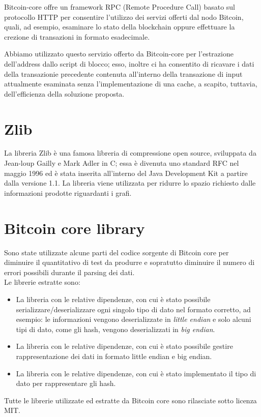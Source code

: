 Bitcoin-core offre un framework RPC (Remote Procedure Call) basato sul protocollo HTTP per consentire l'utilizzo dei servizi offerti dal nodo Bitcoin, quali, ad esempio,  esaminare lo stato della blockchain oppure effettuare la crezione di transazioni in formato esadecimale.

Abbiamo utilizzato questo servizio offerto da Bitcoin-core per l'estrazione dell'address dallo script di blocco; esso, inoltre ci ha consentito di ricavare i dati della transazionie precedente contenuta all'interno della transazione di input attualmente esaminata senza l'implementazione di una cache, a scapito, tuttavia, dell'efficienza della soluzione proposta.

\section{Zlib} \label{sec:zlib}

La libreria Zlib \cite{zlib:github} è una famosa libreria di compressione open source, sviluppata da Jean-loup Gailly e Mark Adler in C; essa è divenuta  uno standard RFC nel maggio 1996 ed è stata inserita all'interno del Java Development Kit a partire dalla versione 1.1.
La libreria viene utilizzata per ridurre lo spazio richiesto dalle informazioni prodotte riguardanti i grafi.

\section{Bitcoin core library} \label{sec:bitcoinCoreLib}

Sono state utilizzate alcune parti del codice sorgente di Bitcoin core per diminuire il quantitativo di test da produrre e sopratutto diminuire il numero di errori possibili durante il parsing dei dati.\\
Le librerie estratte sono:
\begin{itemize}
  \item La libreria  con le relative dipendenze, con cui è stato possibile serializzare/deserializzare ogni singolo tipo di dato nel formato corretto, ad esempio: le informazioni vengono deserializzate in \emph{little endian} e solo alcuni tipi di dato, come gli hash, vengono deserializzati in \emph{big endian}.
  \item La libreria  con le relative dipendenze, con cui è stato possibile gestire rappresentazione dei dati in formato little endian e big endian.
  \item La libreria  con le relative dipendenze, con cui è stato implementato il tipo di dato per rappresentare gli hash.
\end{itemize}
Tutte le librerie utilizzate ed estratte da Bitcoin core sono rilasciate sotto licenza MIT.

